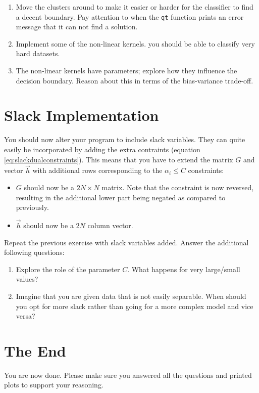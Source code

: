 \documentclass{article}
\begin{document}
\begin{tcolorbox}
\begin{enumerate}
\item
  Move the clusters around to make it easier or harder for the
  classifier to find a decent boundary.  Pay attention to when
  the \texttt{qt} function prints an error message that it can
  not find a solution.
\item
  Implement some of the non-linear kernels. you should be able to
  classify very hard datasets.
\item
  The non-linear kernels have parameters;
  explore how they influence the decision boundary.
  Reason about this in terms of the bias-variance trade-off.
\end{enumerate}
\end{tcolorbox}

\section{Slack Implementation}

You should now alter your program to include slack variables.
They can quite easily be incorporated by adding the extra
contraints (equation \ref{eq:slackdualconstraints}).  This means that
you have to extend the matrix \(G\) and vector \(\vec{h}\) with additional rows
corresponding to the \(\alpha_i \le C\) constraints:

\begin{itemize}
\item $G$ should now be a $2 N \times N$ matrix. Note that the constraint is now reversed, resulting
      in the additional lower part being negated as compared to previously.
\item $\vec{h}$ should now be a $2 N$ column vector. %
\end{itemize}

Repeat the previous exercise with slack variables added.
Answer the additional following questions:
\begin{tcolorbox}
\begin{enumerate}
\item Explore the role of the parameter \(C\). What happens for very large/small values?
\item Imagine that you are given data that is not easily separable.
      When should you opt for more slack rather than going for a more complex model and vice versa?
\end{enumerate}
\end{tcolorbox}

\section{The End}

You are now done. Please make sure you answered all the questions and
printed plots to support your reasoning.
\end{document}
